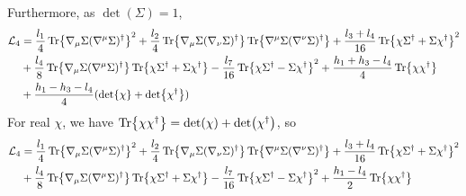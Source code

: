 Furthermore, as $\det(\Sigma)= 1$, 
\begin{align}
    \notag
    \mathcal{L}_4 
    & = 
    \frac{l_1}{4} \Tr{\nabla_\mu \Sigma (\nabla^\mu \Sigma)^\dagger}^2
    + \frac{l_2}{4} \Tr{\nabla_\mu \Sigma (\nabla_\nu \Sigma)^\dagger} 
    \Tr{\nabla^\mu \Sigma (\nabla^\nu \Sigma)^\dagger} 
    +
    \frac{l_3 + l_4 }{16} \Tr{\chi \Sigma^\dagger + \Sigma \chi^\dagger}^2
    \\\notag
    &
    + \frac{l_4}{8}\Tr{\nabla_\mu \Sigma (\nabla^\mu \Sigma)^\dagger} \Tr{\chi \Sigma^\dagger + \Sigma \chi^\dagger}
    - \frac{l_7}{16} \Tr{\chi \Sigma^\dagger - \Sigma \chi^\dagger}^2
    + \frac{h_1 + h_3 -l_4}{4} \Tr{\chi \chi^\dagger} \\
    & +\frac{h_1 - h_3 - l_4}{4} (\det{\chi} + \det{\chi^\dagger})
\end{align}
For real $\chi$, we have $\Tr{\chi \chi^\dagger} = \det(\chi) + \det(\chi^\dagger)$, so
\begin{align}
    \notag
    \mathcal{L}_4 
    & = 
    \frac{l_1}{4} \Tr{\nabla_\mu \Sigma (\nabla^\mu \Sigma)^\dagger}^2
    + \frac{l_2}{4} \Tr{\nabla_\mu \Sigma (\nabla_\nu \Sigma)^\dagger} 
    \Tr{\nabla^\mu \Sigma (\nabla^\nu \Sigma)^\dagger} 
    +
    \frac{l_3 + l_4 }{16} \Tr{\chi \Sigma^\dagger + \Sigma \chi^\dagger}^2
    \\\notag
    &
    + \frac{l_4}{8}\Tr{\nabla_\mu \Sigma (\nabla^\mu \Sigma)^\dagger} \Tr{\chi \Sigma^\dagger + \Sigma \chi^\dagger}
    - \frac{l_7}{16} \Tr{\chi \Sigma^\dagger - \Sigma \chi^\dagger}^2
    + \frac{h_1 - l_4}{2} \Tr{\chi \chi^\dagger} \\
\end{align}
 
